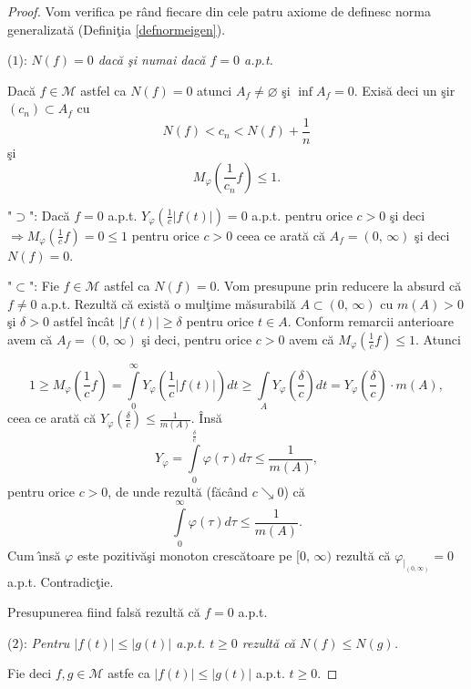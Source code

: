 \documentclass[ a4paper, 12pt]{report}
\theoremstyle{definition}
\theoremstyle{remark}
\numberwithin{equation}{section}
\begin{document}
\begin{proof} Vom verifica pe r\^ and fiecare din cele patru axiome de definesc norma generalizat\u a (Defini\c tia \ref{defnormeigen}).

\smallskip

($1$): {\it $N(f) = 0$ dac\u a \c si numai dac\u a $f = 0$ a.p.t.}

\smallskip

Dac\u a $f \in \mathcal{M}$ astfel ca $N(f) = 0$ atunci $A_f \neq \varnothing$ \c si $\inf A_f = 0$. Exis\u a deci un \c sir $(c_n) \subset A_f$ cu
$$N(f) < c_n < N(f)+ \frac{1}{n}$$ \c si $$M_\varphi (\frac{1}{c_n}f) \leq 1.$$

"$\supset$": Dac\u a $f = 0$ a.p.t. $Y_\varphi (\frac{1}{c} \lvert f(t) \rvert) = 0$ a.p.t. pentru orice $c > 0$ \c si deci $\Rightarrow M_\varphi (\frac{1}{c}f) = 0 \leq 1$ pentru orice $c > 0$ ceea ce arat\u a c\u a $A_f = (0,\, \infty)$ \c si deci $N(f) = 0$.

"$\subset$": Fie $f \in \mathcal{M}$ astfel ca $N(f) = 0$. Vom presupune prin reducere la absurd c\u a $f \neq 0$ a.p.t. Rezult\u a c\u a exist\u a o mul\c time m\u asurabil\u a $A \subset (0, \, \infty)$ cu $m(A) > 0$ \c si $\delta>0$ astfel \^inc\^at $\lvert f(t)\rvert \geq \delta$ pentru orice $t \in A$. Conform remarcii anterioare avem c\u a $A_f = (0,\, \infty)$ \c si deci, pentru orice $c > 0$ avem c\u a $M_\varphi (\frac{1}{c}f)\leq 1$. Atunci

$$1\geq M_\varphi (\frac{1}{c}f) = \int\limits_{0}^{\infty}Y_\varphi (\frac{1}{c}\lvert f(t) \rvert)dt \geq \int\limits_A Y_\varphi(\frac{\delta}{c})dt = Y_\varphi (\frac{\delta}{c})\cdot m(A),$$
ceea ce arat\u a c\u a $Y_\varphi (\frac{\delta}{c})\leq \frac{1}{m(A)}$. \^Ins\u a
$$Y_\varphi = \int\limits_{0}^{\frac{\delta}{c}} \varphi(\tau) d\tau \leq \frac{1}{m(A)},$$
pentru orice $c>0$, de unde rezult\u a (f\u ac\^ and $c \searrow 0$) c\u a
$$ \int\limits_{0}^{\infty}\varphi(\tau)d\tau \leq \frac{1}{m(A)}.$$
Cum \^\i ns\u a $\varphi$ este pozitiv\u  a\c si monoton cresc\u atoare pe $[0, \, \infty)$ rezult\u a c\u a $ \varphi_{|_{(0,\infty)}} = 0$ a.p.t. Contradic\c tie.

Presupunerea fiind fals\u a  rezult\u a c\u a $f =0$ a.p.t.

\smallskip

($2$): {\it Pentru $\lvert f(t) \rvert \leq \lvert g(t) \rvert$ a.p.t. $t \geq 0$ rezult\u a c\u a $N(f) \leq N(g)$.}

\smallskip

Fie deci $f, g \in \mathcal{M}$ astfe ca $\lvert f(t) \rvert \leq \lvert g(t) \rvert$ a.p.t. $t \geq 0$.


\end{proof}
\end{document}
